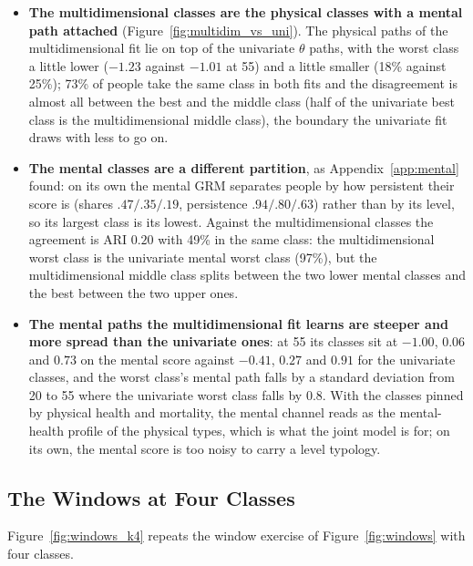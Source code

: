 \documentclass[11pt]{article}
\begin{document}
	\begin{itemize}
		\item \textbf{The multidimensional classes are the physical classes with a mental path attached} (Figure~\ref{fig:multidim_vs_uni}). The physical paths of the multidimensional fit lie on top of the univariate $\theta$ paths, with the worst class a little lower ($-1.23$ against $-1.01$ at 55) and a little smaller (18\% against 25\%); 73\% of people take the same class in both fits and the disagreement is almost all between the best and the middle class (half of the univariate best class is the multidimensional middle class), the boundary the univariate fit draws with less to go on.
		\item \textbf{The mental classes are a different partition}, as Appendix~\ref{app:mental} found: on its own the mental GRM separates people by how persistent their score is (shares $.47/.35/.19$, persistence $.94/.80/.63$) rather than by its level, so its largest class is its lowest. Against the multidimensional classes the agreement is ARI $0.20$ with 49\% in the same class: the multidimensional worst class is the univariate mental worst class (97\%), but the multidimensional middle class splits between the two lower mental classes and the best between the two upper ones.
		\item \textbf{The mental paths the multidimensional fit learns are steeper and more spread than the univariate ones}: at 55 its classes sit at $-1.00$, $0.06$ and $0.73$ on the mental score against $-0.41$, $0.27$ and $0.91$ for the univariate classes, and the worst class's mental path falls by a standard deviation from 20 to 55 where the univariate worst class falls by $0.8$. With the classes pinned by physical health and mortality, the mental channel reads as the mental-health profile of the physical types, which is what the joint model is for; on its own, the mental score is too noisy to carry a level typology.
	\end{itemize}

	\subsection{The Windows at Four Classes}
	\label{app:windows_k4}

	Figure~\ref{fig:windows_k4} repeats the window exercise of Figure~\ref{fig:windows} with four classes.
\end{document}
